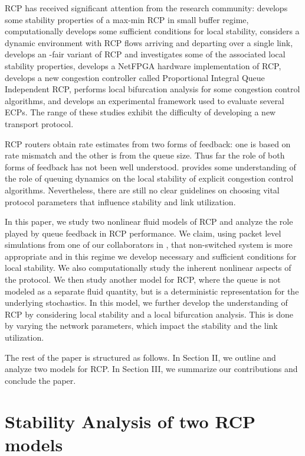 \documentclass[conference]{IEEEtran}
\begin{document}
RCP has received significant attention from the research community: \cite{vr} develops some stability properties 
of a  max-min RCP in small buffer regime, \cite{nanswitch} computationally develops some sufficient 
conditions for local stability, \cite{bufferrcp} considers a dynamic environment with RCP flows arriving 
and departing over a single link, \cite{krv} develops an -fair variant of RCP and investigates 
some of the associated local stability properties, \cite{netfpga} develops a NetFPGA hardware 
implementation of RCP, \cite{piqi} develops a new congestion controller called Proportional Integral Queue Independent RCP,  \cite{gra} performs local bifurcation analysis for some congestion control algorithms, and \cite{zhang} develops an experimental framework used to evaluate several ECPs.  The range of these studies exhibit the difficulty 
of developing a new transport protocol.

RCP routers obtain rate estimates from two forms of feedback: one is based on rate 
mismatch and the other is from the queue size. Thus far the role of both forms of feedback has 
not been well understood. \cite{nanswitch} provides some understanding of the role of queuing dynamics
on the local stability of explicit congestion control algorithms. Nevertheless, there are still no
clear guidelines on choosing vital protocol parameters that influence 
 stability and link utilization.

In this paper, we study two nonlinear fluid models of RCP and analyze the role played by queue feedback
in RCP performance. We claim, using packet level simulations from one of our collaborators in \cite{krv}, that non-switched system is more 
appropriate and in this regime we develop necessary and sufficient conditions for local stability. 
We also computationally study the inherent nonlinear aspects of the protocol.
We then study another model for RCP, where the queue is not modeled as 
a separate fluid quantity, but is a deterministic representation for the underlying stochastics. In this model, 
we further develop the understanding of RCP by considering local stability and a local bifurcation analysis. 
This is done by varying the network parameters, which impact the stability and the link utilization. 

The rest of the paper is structured as follows. In Section II, we outline and analyze two models 
for RCP. In Section III, we summarize our contributions and conclude the paper.

\section{Stability Analysis of two RCP models}
\end{document}
